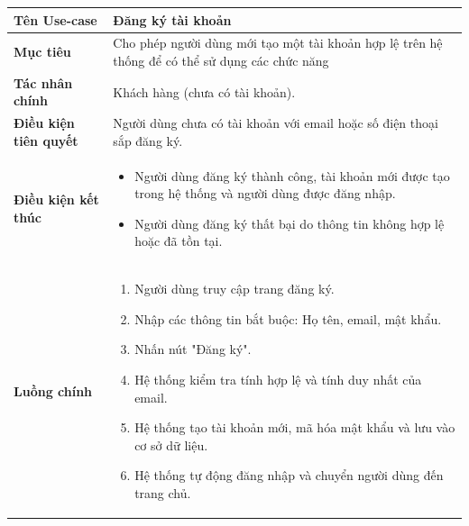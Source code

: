 
\begin{table}[H]
\centering
\renewcommand{\arraystretch}{1.3}
\begin{tabular}{|p{4cm}|p{10cm}|}
\hline
\textbf{Tên Use-case} 
& Đăng ký tài khoản \\ 
\hline

\textbf{Mục tiêu} 
& Cho phép người dùng mới tạo một tài khoản hợp lệ trên hệ thống để có thể sử dụng các chức năng \\ 
\hline

\textbf{Tác nhân chính} 
& Khách hàng (chưa có tài khoản). \\ 
\hline

\textbf{Điều kiện tiên quyết} 
& Người dùng chưa có tài khoản với email hoặc số điện thoại sắp đăng ký. \\ 
\hline

\textbf{Điều kiện kết thúc} 
& 
\begin{itemize}
\item Người dùng đăng ký thành công, tài khoản mới được tạo trong hệ thống và người dùng được đăng nhập.
\item Người dùng đăng ký thất bại do thông tin không hợp lệ hoặc đã tồn tại.
\end{itemize} \\ 
\hline

\textbf{Luồng chính} 
& 
\begin{enumerate}
    \item Người dùng truy cập trang đăng ký.
    \item Nhập các thông tin bắt buộc: Họ tên, email, mật khẩu.
    \item Nhấn nút "Đăng ký".
    \item Hệ thống kiểm tra tính hợp lệ và tính duy nhất của email.
    \item Hệ thống tạo tài khoản mới, mã hóa mật khẩu và lưu vào cơ sở dữ liệu.
    \item Hệ thống tự động đăng nhập và chuyển người dùng đến trang chủ.
\end{enumerate} \\ 
\hline


\end{tabular}
\end{table}
